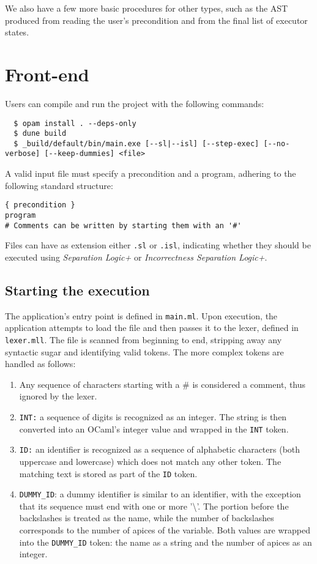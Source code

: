 \documentclass[parskip=half]{scrartcl}
\begin{document}
We also have a few more basic procedures for other types, such as the AST produced from reading the user's precondition and from the final list of executor states.

\section{Front-end}
Users can compile and run the project with the following commands:
\begin{verbatim}
  $ opam install . --deps-only
  $ dune build
  $ _build/default/bin/main.exe [--sl|--isl] [--step-exec] [--no-verbose] [--keep-dummies] <file>
\end{verbatim}

A valid input file must specify a precondition and a program, adhering to the following standard structure:

\begin{verbatim}
{ precondition }
program
# Comments can be written by starting them with an '#'
\end{verbatim}

Files can have as extension either \texttt{.sl} or \texttt{.isl}, 
indicating whether they should be executed using 
\textit{Separation Logic+} or \textit{Incorrectness Separation Logic+}.

\subsection{Starting the execution}
The application's entry point is defined in \texttt{main.ml}.
Upon execution, the application attempts to load the file and then passes it to the lexer, defined in \texttt{lexer.mll}. 
The file is scanned from beginning to end, stripping away any syntactic sugar and identifying valid tokens.
The more complex tokens are handled as follows:

\begin{enumerate}
  \item Any sequence of characters starting with a \# is considered a comment, thus ignored by the lexer.
  
  \item \texttt{INT:} a sequence of digits is recognized as an integer. 
  The string is then converted into an OCaml's integer value and wrapped in the \texttt{INT} token.
      

  \item \texttt{ID:} an identifier is recognized as a sequence of alphabetic characters (both uppercase and lowercase) which does not match any other token. 
        The matching text is stored as part of the \texttt{ID} token.
  
  \item \texttt{DUMMY\_ID}: a dummy identifier is similar to an identifier, with the exception that
        its sequence must end with one or more '\textbackslash{}'.
        The portion before the backslashes is treated as the name, while the number of backslashes corresponds to the number of apices of the variable.
        Both values are wrapped into the \texttt{DUMMY\_ID} token: the name as a string and the number of apices as an integer.
\end{enumerate}
\end{document}
